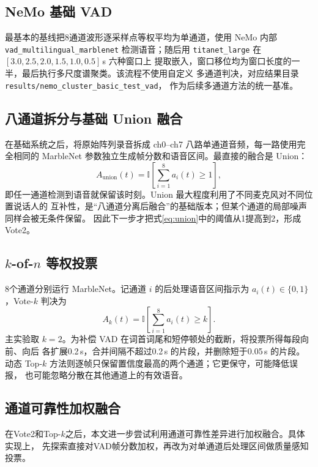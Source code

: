 \documentclass[UTF8,a4paper,10pt]{ctexart}
\begin{document}
\subsection{NeMo 基础 VAD}

最基本的基线把8通道波形逐采样点等权平均为单通道，使用 NeMo 内部
\texttt{vad\_multilingual\_marblenet} 检测语音；随后用
\texttt{titanet\_large} 在 $[3.0,2.5,2.0,1.5,1.0,0.5]$\,s 六种窗口上
提取嵌入，窗口移位均为窗口长度的一半，最后执行多尺度谱聚类。该流程不使用自定义
多通道判决，对应结果目录 \texttt{results/nemo\_cluster\_basic\_test\_vad}，
作为后续多通道方法的统一基准。

\subsection{八通道拆分与基础 Union 融合}

在基础系统之后，将原始阵列录音拆成 ch0--ch7 八路单通道音频，每一路使用完全相同的
MarbleNet 参数独立生成帧分数和语音区间。最直接的融合是 Union：
\begin{equation}
A_{\mathrm{union}}(t)=\mathbb{I}\left[\sum_{i=1}^{8}a_i(t)\ge 1\right],
\label{eq:union}
\end{equation}
即任一通道检测到语音就保留该时刻。Union 最大程度利用了不同麦克风对不同位置说话人的
互补性，是“八通道分离后融合”的基础版本；但某个通道的局部噪声同样会被无条件保留。
因此下一步才把式\eqref{eq:union}中的阈值从1提高到2，形成 Vote2。

\subsection{$k$-of-$n$ 等权投票}

8个通道分别运行 MarbleNet。记通道 $i$ 的后处理语音区间指示为
$a_i(t)\in\{0,1\}$，Vote-$k$ 判决为
\begin{equation}
A_k(t)=\mathbb{I}\left[\sum_{i=1}^{8}a_i(t)\ge k\right].
\label{eq:vote}
\end{equation}
主实验取 $k=2$。为补偿 VAD 在词首词尾和短停顿处的截断，将投票所得每段向前、向后
各扩展0.2\,s，合并间隔不超过0.2\,s 的片段，并删除短于0.05\,s 的片段。
动态 Top-$k$ 方法则逐帧只保留置信度最高的两个通道；它更保守，可能降低误报，
也可能忽略分散在其他通道上的有效语音。

\subsection{通道可靠性加权融合}

在Vote2和Top-$k$之后，本文进一步尝试利用通道可靠性差异进行加权融合。具体实现上，
先探索直接对VAD帧分数加权，再改为对单通道后处理区间做质量感知投票。
\end{document}
